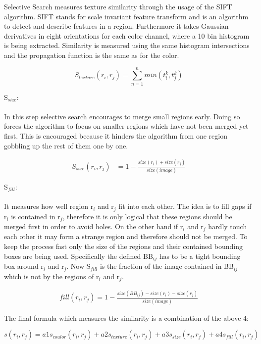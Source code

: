 Selective Search measures texture similarity through the usage of the SIFT algorithm. SIFT stands for scale invariant
feature transform and is an algorithm to detect and describe features in a region. Furthermore it takes Gaussian derivatives
in eight orientations for each color channel, where a 10 bin histogram is being extracted. Similarity is measured
using the same histogram intersections and the propagation function is the same as for the color.\cite{selectivesearch}
\begin{center}
    \begin{equation*}
        S_{texture}(r_i,r_j) = \sum_{n=1}^{n} min(t_i^{k},t_j^{k})
    \end{equation*}\cite{selectivesearch}
\end{center}
S$_{size}$: \\ \\
In this step selective search encourages to merge small regions early. Doing so forces the algorithm to focus
on smaller regions which have not been merged yet first. This is encouraged because it hinders the algorithm from one
region gobbling up the rest of them one by one.\cite{selectivesearch}
\begin{center}
    \begin{equation*}
        \begin{split}
            S_{size}(r_i,r_j) & = 1 - \frac{size(r_i)+size(r_j)}{size(image)}
        \end{split}
    \end{equation*}\cite{selectivesearch}
\end{center}
S$_{fill}$: \\ \\
It measures how well region r$_i$ and r$_j$ fit into each other. The idea is to fill gaps if r{$_i$} is contained in
r$_j$, therefore it is only logical that these regions should be merged first in order to avoid holes. On the other hand
if r$_i$ and r$_j$ hardly touch each other it may form a strange region and therefore should not be merged. To keep
the process fast only the size of the regions and their contained bounding boxes are being used. Specifically the defined
BB$_{ij}$ has to be a tight bounding box around r$_i$ and r$_j$. Now S$_{fill}$ is the fraction of the image
contained in BB$_{ij}$ which is not by the regions of r$_i$ and r$_j$.\cite{selectivesearch}
\begin{center}
    \begin{equation*}
        \begin{split}
            fill(r_i, r_j) = 1 - \frac{size(BB_{ij}) - size(r_i) - size(r_j)}{size(image)}
        \end{split}
    \end{equation*}\cite{selectivesearch}
\end{center}
The final formula which measures the similarity is a combination of the above 4:
\begin{center}
    \begin{equation*}
        s(r_i,r_j) = a1s_{coulor}(r_i,r_j) + a2s_{texture}(r_i,r_j) + a3s_{size}(r_i,r_j) + a4s_{fill}(r_i,r_j)
    \end{equation*}\cite{selectivesearch}
\end{center}
